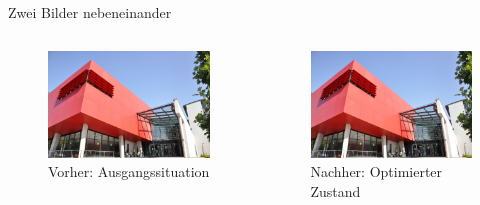 \documentclass[aspectratio=169,10pt]{beamer}
\begin{document}
\begin{frame}{Zwei Bilder nebeneinander}
\begin{columns}[c]
  \begin{column}{0.48\textwidth}
    \begin{figure}
      \centering
      \includegraphics[width=\textwidth]{assets/dm_roter_wuerfel_ben_steinig.jpg}
      \caption{Vorher: Ausgangssituation}
    \end{figure}
  \end{column}
  \hfill
  \begin{column}{0.48\textwidth}
    \begin{figure}
      \centering
      \includegraphics[width=\textwidth]{assets/dm_roter_wuerfel_ben_steinig.jpg}
      \caption{Nachher: Optimierter Zustand}
    \end{figure}
  \end{column}
\end{columns}
\end{frame}
\end{document}
